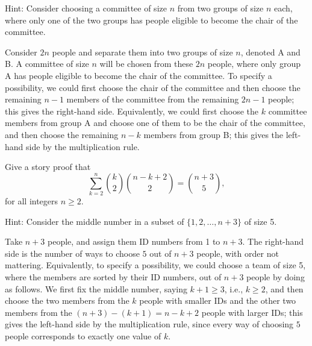 {    Hint: Consider choosing a committee of size $n$ from two groups of size $n$ each, where only one of the two groups has people eligible to become the chair of the committee. 
    \begin{solution}
        \begin{storyproof}
            Consider $2n$ people and separate them into two groups of size $n$, denoted A and B. 
            A committee of size $n$ will be chosen from these $2n$ people, where only group A has people eligible to become the chair of the committee. 
            To specify a possibility, we could first choose the chair of the committee and then choose the remaining $n-1$ members of the committee from the remaining $2n-1$ people; this gives the right-hand side. 
            Equivalently, we could first choose the $k$ committee members from group A and choose one of them to be the chair of the committee, and then choose the remaining $n-k$ members from group B; this gives the left-hand side by the multiplication rule. 
        \end{storyproof}
    \end{solution}
    \item %
    Give a story proof that 
    \begin{equation*}
        \sum_{k=2}^{n} \binom{k}{2} \binom{n-k+2}{2} = \binom{n+3}{5}, 
    \end{equation*}
    for all integers $n \geq 2$. 

    Hint: Consider the middle number in a subset of $\{ 1, 2, \dots, n+3 \}$ of size 5. 
    \begin{solution}
        \begin{storyproof}
            Take $n+3$ people, and assign them ID numbers from 1 to $n+3$. 
            The right-hand side is the number of ways to choose $5$ out of $n+3$ people, with order not mattering. 
            Equivalently, to specify a possibility, we could choose a team of size 5, where the members are sorted by their ID numbers, out of $n+3$ people by doing as follows. 
            We first fix the middle number, saying $k+1 \geq 3$, i.e., $k \geq 2$, and then choose the two members from the $k$ people with smaller IDs and the other two members from the $(n+3)-(k+1) = n-k+2$ people with larger IDs; this gives the left-hand side by the multiplication rule, since every way of choosing $5$ people corresponds to exactly one value of $k$. 
        \end{storyproof}
    \end{solution}
    \item %
    }

